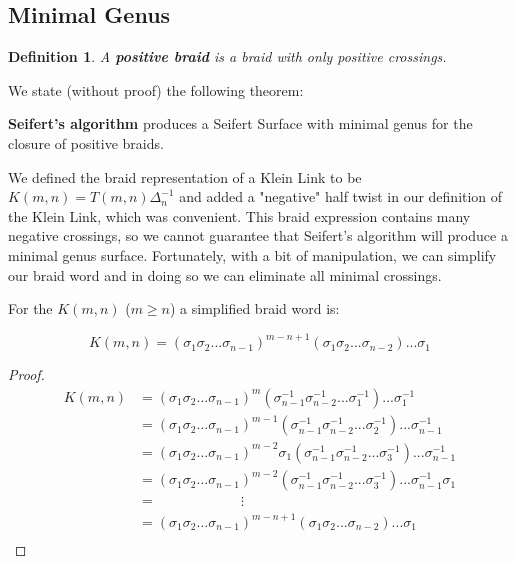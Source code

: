 \documentclass[12pt]{article}
\newtheorem{definition}{Definition}[section]
\newenvironment{theorem}[2][Theorem]{\begin{trivlist}
\item[\hskip \labelsep {\bfseries #1}\hskip \labelsep {\bfseries #2.}]}{\end{trivlist}}
\begin{document}
\subsection{Minimal Genus}

\begin{definition}
A \textbf{positive braid} is a braid with only positive crossings.
\end{definition}

We state (without proof) the following theorem:

\begin{theorem}{2.3}

\textbf{Seifert's algorithm} produces a Seifert Surface with minimal genus for the closure of positive braids.
\end{theorem}

We defined the braid representation of a Klein Link to be $K(m, n) = T(m, n) \Delta^{-1}_n$ and added a "negative" half twist in our definition of the Klein Link, which was convenient. This braid expression contains many negative crossings, so we cannot guarantee that Seifert's algorithm will produce a minimal genus surface. Fortunately, with a bit of manipulation, we can simplify our braid word and in doing so we can eliminate all minimal crossings.

\begin{theorem}{2.4}
For the $K(m, n)$ ($m \geq n$) a simplified braid word is:

\end{theorem}
\begin{equation}
K(m, n) = (\sigma_1 \sigma_2 ... \sigma_{n-1})^{m-n+1}(\sigma_1 \sigma_2...\sigma_{n-2})...\sigma_1
\end{equation}

\begin{proof}
\begin{align*}
K(m, n) &= (\sigma_1 \sigma_2 ... \sigma_{n-1})^m (\sigma_{n-1}^{-1} \sigma_{n-2}^{-1}... \sigma_1^{-1})...\sigma_1^{-1}\\
&=(\sigma_1 \sigma_2...\sigma_{n-1})^{m-1}(\sigma_{n-1}^{-1} \sigma_{n-2}^{-1}...\sigma_2^{-1})...\sigma_{n-1}^{-1} \\
&=(\sigma_1 \sigma_2...\sigma_{n-1})^{m-2}\sigma_1 (\sigma_{n-1}^{-1} \sigma_{n-2}^{-1}...\sigma_3^{-1})...\sigma_{n-1}^{-1}  \\
&= (\sigma_1 \sigma_2...\sigma_{n-1})^{m-2} (\sigma_{n-1}^{-1} \sigma_{n-2}^{-1}...\sigma_3^{-1})...\sigma_{n-1}^{-1} \sigma_1 \\
&=  \hspace{1in} \vdots \\
&= (\sigma_1 \sigma_2...\sigma_{n-1})^{m-n+1}(\sigma_1 \sigma_2 ... \sigma_{n-2})...\sigma_1 \\
\end{align*}
\end{proof}
\end{document}
